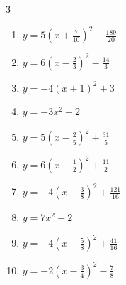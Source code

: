 \begin{multicols}{3}
\begin{enumerate}
  \item $\displaystyle y=5\left( x+\frac{7}{10}\right)^{2}-\frac{189}{20}$


  \item $\displaystyle y=6\left( x-\frac{2}{3}\right)^{2}-\frac{14}{3}$


  \item $\displaystyle y=-4\left( x+1\right)^{2}+3$

        \phantom{$\displaystyle 頂点\left( -1 , 3 \right)$}

  \item $\displaystyle y=-3x^{2}-2$

        \phantom{$\displaystyle 頂点\left( 0 , -2 \right)$}

  \item $\displaystyle y=5\left( x-\frac{2}{5}\right)^{2}+\frac{31}{5}$


  \item $\displaystyle y=6\left( x-\frac{1}{2}\right)^{2}+\frac{11}{2}$


  \item $\displaystyle y=-4\left( x-\frac{3}{8}\right)^{2}+\frac{121}{16}$


  \item $\displaystyle y=7x^{2}-2$

        \phantom{$\displaystyle 頂点\left( 0 , -2 \right)$}

  \item $\displaystyle y=-4\left( x-\frac{5}{8}\right)^{2}+\frac{41}{16}$


  \item $\displaystyle y=-2\left( x-\frac{3}{4}\right)^{2}-\frac{7}{8}$



\end{enumerate}
\end{multicols}
